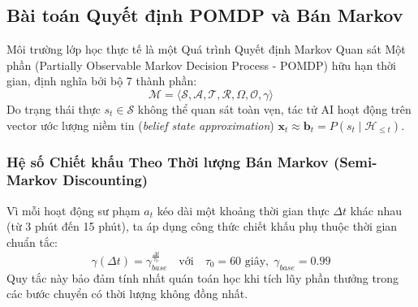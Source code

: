 \subsection{Bài toán Quyết định POMDP và Bán Markov}\label{subsec:pomdp-formulation}
Môi trường lớp học thực tế là một Quá trình Quyết định Markov Quan sát Một phần (Partially Observable Markov Decision Process - POMDP) hữu hạn thời gian, định nghĩa bởi bộ 7 thành phần:
\begin{equation}\label{eq:pomdp-tuple}
  \mathcal{M} = \langle \mathcal{S}, \mathcal{A}, \mathcal{T}, \mathcal{R}, \Omega, \mathcal{O}, \gamma \rangle
\end{equation}
Do trạng thái thực $s_t \in \mathcal{S}$ không thể quan sát toàn vẹn, tác tử AI hoạt động trên vector ước lượng niềm tin (\textit{belief state approximation}) $\mathbf{x}_t \approx \mathbf{b}_t = P(s_t \mid \mathcal{H}_{\le t})$.

\subsubsection{Hệ số Chiết khấu Theo Thời lượng Bán Markov (Semi-Markov Discounting)}
Vì mỗi hoạt động sư phạm $a_t$ kéo dài một khoảng thời gian thực $\Delta t$ khác nhau (từ 3 phút đến 15 phút), ta áp dụng công thức chiết khấu phụ thuộc thời gian chuẩn tắc:
\begin{equation}\label{eq:semi-markov-discount}
  \gamma(\Delta t) = \gamma_{base}^{\frac{\Delta t}{\tau_0}} \quad \text{với} \quad \tau_0 = 60\text{ giây}, \; \gamma_{base} = 0.99
\end{equation}
Quy tắc này bảo đảm tính nhất quán toán học khi tích lũy phần thưởng trong các bước chuyển có thời lượng không đồng nhất.

